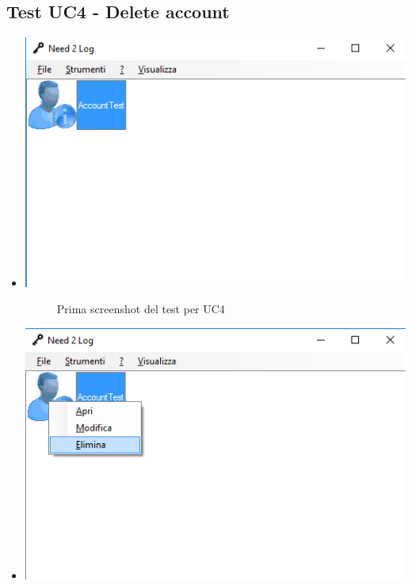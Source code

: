 \documentclass[a4paper,10pt]{report}
\begin{document}
			\subsection{Test UC4 - Delete account}
				\begin{itemize}
					\item[] {
						\begin{center}
							\includegraphics[scale=1]{immagini/test/testUC4_1.png}
							\end{center}
						\begin{figure}[!h]
								\caption{Prima screenshot del test per UC4}
							\end{figure}}
					\item[] {
						\begin{center}
							\includegraphics[scale=1]{immagini/test/testUC4_2.png}
							\end{center}
						\begin{figure}[!h]

\end{figure}}
\end{itemize}
\end{document}
